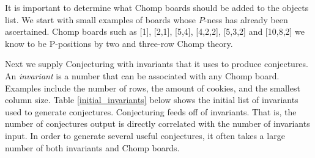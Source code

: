 \documentclass{amsart}
\theoremstyle{definition}
\theoremstyle{remark}
\numberwithin{equation}{section}
\begin{document}
It is important to determine what Chomp boards should be added to the objects list.  We start with small examples of boards whose $P$-ness has already been ascertained.  Chomp boards such as [1], [2,1], [5,4], [4,2,2], [5,3,2]  and [10,8,2] we know to be P-positions by two\cite{Gale74} and three-row\cite{3row} Chomp theory.





Next we supply Conjecturing with invariants that it uses to produce conjectures.  An \textit{invariant} is a number that can be associated with any Chomp board.  Examples include the number of rows, the amount of cookies, and the smallest column size.  Table \ref{initial_invariants} below shows the initial list of invariants used to generate conjectures.
\indent Conjecturing feeds off of invariants.  That is, the number of conjectures output is directly correlated with the number of invariants input.  In order to generate several useful conjectures, it often takes a large number of both invariants and Chomp boards.

\end{document}
